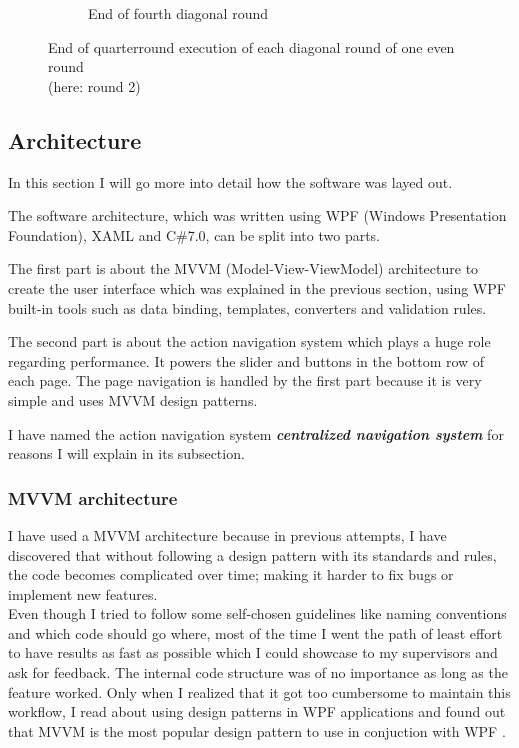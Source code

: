 \begin{figure}
\begin{subfigure}{0.5\textwidth}
  \caption{End of fourth diagonal round}
  \label{fig:chachahash.dr.4}
\end{subfigure}
\caption[End of diagonal rounds]{End of quarterround execution of each diagonal round of one even round \\(here: round 2)}
\label{fig:chachahash.dr}
\end{figure}

\subsection{Architecture}
\label{sec:Architecture}

In this section I will go more into detail how the software was layed out.

The software architecture, which was written using WPF (Windows Presentation Foundation), XAML and C\#7.0, can be split into two parts.

The first part is about the MVVM (Model-View-ViewModel) architecture to create the user interface which was explained in the previous section, using WPF built-in tools such as data binding, templates, converters and validation rules.

The second part is about the action navigation system which plays a huge role regarding performance. It powers the slider and buttons in the bottom row of each page. The page navigation is handled by the first part because it is very simple and uses MVVM design patterns.

I have named the action navigation system \textit{\textbf{centralized navigation system}} for reasons I will explain in its subsection.

\subsubsection{MVVM architecture}

I have used a MVVM architecture because in previous attempts, I have discovered that without following a design pattern with its standards and rules, the code becomes complicated over time; making it harder to fix bugs or implement new features. \\
Even though I tried to follow some self-chosen guidelines like naming conventions and which code should go where, most of the time I went the path of least effort to have results as fast as possible which I could showcase to my supervisors and ask for feedback. The internal code structure was of no importance as long as the feature worked. Only when I realized that it got too cumbersome to maintain this workflow, I read about using design patterns in WPF applications and found out that MVVM is the most popular design pattern to use in conjuction with WPF \cite{mvvm-wpf}.

